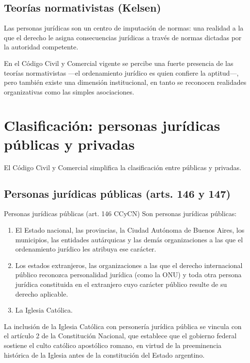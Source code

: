 \documentclass[12pt,oneside]{book}
\begin{document}
\subsection{Teorías normativistas (Kelsen)}

Las personas jurídicas son un centro de imputación de normas: una realidad a la que el derecho le asigna consecuencias jurídicas a través de normas dictadas por la autoridad competente.

\begin{note}
En el Código Civil y Comercial vigente se percibe una fuerte presencia de las teorías normativistas —el ordenamiento jurídico es quien confiere la aptitud—, pero también existe una dimensión institucional, en tanto se reconocen realidades organizativas como las simples asociaciones.
\end{note}

\section{Clasificación: personas jurídicas públicas y privadas}

El Código Civil y Comercial simplifica la clasificación entre públicas y privadas.

\subsection{Personas jurídicas públicas (arts. 146 y 147)}

\begin{definition}{Personas jurídicas públicas (art. 146 CCyCN)}
Son personas jurídicas públicas:
\begin{enumerate}[label=\alph*)]
    \item El Estado nacional, las provincias, la Ciudad Autónoma de Buenos Aires, los municipios, las entidades autárquicas y las demás organizaciones a las que el ordenamiento jurídico les atribuya ese carácter.
    \item Los estados extranjeros, las organizaciones a las que el derecho internacional público reconozca personalidad jurídica (como la ONU) y toda otra persona jurídica constituida en el extranjero cuyo carácter público resulte de su derecho aplicable.
    \item La Iglesia Católica.
\end{enumerate}
\end{definition}

La inclusión de la Iglesia Católica con personería jurídica pública se vincula con el artículo 2 de la Constitución Nacional, que establece que el gobierno federal sostiene el culto católico apostólico romano, en virtud de la preeminencia histórica de la Iglesia antes de la constitución del Estado argentino.
\end{document}
